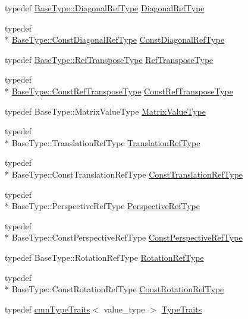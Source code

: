 \begin{DoxyCompactItemize}
\item 
typedef \hyperlink{classvct_frame4x4_const_base_a6712c128a1d2b45ab9c713befeddf2c6}{Base\-Type\-::\-Diagonal\-Ref\-Type} \hyperlink{classvct_frame4x4_base_a838fede6632e0623204c42f3e49bce96}{Diagonal\-Ref\-Type}
\item 
typedef \\*
\hyperlink{classvct_frame4x4_const_base_a83c846e0b484264c6d71c101b67d164a}{Base\-Type\-::\-Const\-Diagonal\-Ref\-Type} \hyperlink{classvct_frame4x4_base_ae8ff29e1d404cc75dd2163bf99446d90}{Const\-Diagonal\-Ref\-Type}
\item 
typedef \hyperlink{classvct_frame4x4_const_base_a1cedffcdbf60e8ec01a0a61d6ceb24b7}{Base\-Type\-::\-Ref\-Transpose\-Type} \hyperlink{classvct_frame4x4_base_aee8d584095f21f29903fe8a8b62fb9c6}{Ref\-Transpose\-Type}
\item 
typedef \\*
\hyperlink{classvct_frame4x4_const_base_acac151b2d8a361ed229d8cdacac2b01f}{Base\-Type\-::\-Const\-Ref\-Transpose\-Type} \hyperlink{classvct_frame4x4_base_a1f3226ad5b15ec1edb95cfe760eacc4f}{Const\-Ref\-Transpose\-Type}
\item 
typedef Base\-Type\-::\-Matrix\-Value\-Type \hyperlink{classvct_frame4x4_base_a46b60268d306fa5edcfc229da61501ca}{Matrix\-Value\-Type}
\item 
typedef \\*
Base\-Type\-::\-Translation\-Ref\-Type \hyperlink{classvct_frame4x4_base_a0450063a4ebdf0f0c87c7f3fa789a17f}{Translation\-Ref\-Type}
\item 
typedef \\*
Base\-Type\-::\-Const\-Translation\-Ref\-Type \hyperlink{classvct_frame4x4_base_a720869bcd28db8ef2f9f13294097e99e}{Const\-Translation\-Ref\-Type}
\item 
typedef \\*
Base\-Type\-::\-Perspective\-Ref\-Type \hyperlink{classvct_frame4x4_base_a445582cef7ba9f03553b1d9e63a2d64c}{Perspective\-Ref\-Type}
\item 
typedef \\*
Base\-Type\-::\-Const\-Perspective\-Ref\-Type \hyperlink{classvct_frame4x4_base_a47161d0a7598341722759640af9413e5}{Const\-Perspective\-Ref\-Type}
\item 
typedef Base\-Type\-::\-Rotation\-Ref\-Type \hyperlink{classvct_frame4x4_base_a57cec1ba52b9787d77da60fb020c1999}{Rotation\-Ref\-Type}
\item 
typedef \\*
Base\-Type\-::\-Const\-Rotation\-Ref\-Type \hyperlink{classvct_frame4x4_base_a427cd6a2c5f48f68fde733a9b51a83e3}{Const\-Rotation\-Ref\-Type}
\item 
typedef \hyperlink{classcmn_type_traits}{cmn\-Type\-Traits}$<$ value\-\_\-type $>$ \hyperlink{classvct_frame4x4_base_ac03fa3e28721aea50a67d65e86963bd7}{Type\-Traits}
\end{DoxyCompactItemize}
